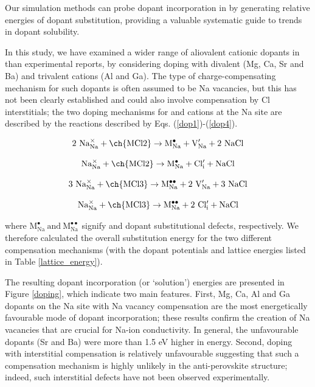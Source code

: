 \documentclass[12pt]{report}
\begin{document}
\addtocounter{equation}{6}

Our simulation methods can probe dopant incorporation in  by generating relative energies of dopant substitution, providing a valuable systematic guide to trends in dopant solubility.  

In this study, we have examined a wider range of aliovalent cationic dopants in  than experimental reports, by considering doping with divalent (Mg, Ca, Sr and Ba) and trivalent cations (Al and Ga). 
The type of charge-compensating mechanism for such dopants is often assumed to be Na vacancies, but this has not been clearly established and could also involve compensation by Cl interstitials; the two doping mechanisms for  and  cations at the Na site are described by the reactions described by Eqs. (\ref{dop1})-(\ref{dop4}).

\begin{equation}
\mathrm{2 \ Na_{Na}^{\times} + \ch{MCl2} \rightarrow M_{Na}^{\bullet} + V_{Na}^{\prime} + 2 \ NaCl}
\label{dop1}
\end{equation}

\begin{equation}
\mathrm{Na_{Na}^{\times} + \ch{MCl2} \rightarrow M_{Na}^{\bullet} + Cl_{i}^{\prime} + NaCl}
\label{dop2}
\end{equation}

\begin{equation}
\mathrm{3 \ Na_{Na}^{\times} + \ch{MCl3} \rightarrow M_{Na}^{\bullet\bullet} + 2 \ V_{Na}^{\prime} + 3 \ NaCl}
\label{dop3}
\end{equation}

\begin{equation}
\mathrm{Na_{Na}^{\times} + \ch{MCl3} \rightarrow M_{Na}^{\bullet\bullet} + 2 \ Cl_{i}^{\prime} + NaCl}
\label{dop4}
\end{equation}

\noindent
where $\mathrm{M_{Na}^{\bullet} \ and \ M_{Na}^{\bullet\bullet}}$ signify  and  dopant substitutional defects, respectively. We therefore calculated the overall substitution energy for the two different compensation mechanisms (with the dopant potentials and lattice energies listed in Table \ref{lattice_energy}).  

The resulting dopant incorporation (or ‘solution’) energies are presented in Figure \ref{doping}, which indicate two main features. 
First, Mg, Ca, Al and Ga dopants on the Na site with Na vacancy compensation are the most energetically favourable mode of dopant incorporation; these results confirm the creation of Na vacancies that are crucial for Na-ion conductivity. 
In general, the unfavourable dopants (Sr and Ba) were more than 1.5 eV higher in energy.  
Second, doping with  interstitial compensation is relatively unfavourable suggesting that such a compensation mechanism is highly unlikely in the anti-perovskite structure; indeed, such interstitial defects have not been observed experimentally. 
\end{document}
